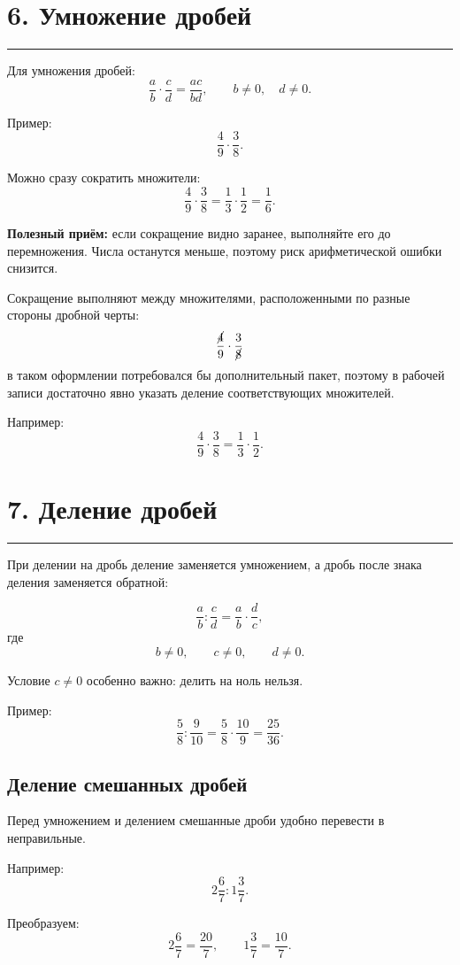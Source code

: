 \documentclass[a4paper,12pt]{article}
\newcommand{\sectionline}{%
    \vspace{-0.25em}
    {\color{accent}\rule{\linewidth}{0.7pt}}
    \vspace{0.3em}
}
\newcommand{\important}[1]{\textcolor{darkaccent}{\textbf{#1}}}
\begin{document}
\section*{\color{darkaccent}6. Умножение дробей}
\sectionline

Для умножения дробей:
\[
\frac ab\cdot\frac cd
=
\frac{ac}{bd},
\qquad b\ne0,\quad d\ne0.
\]

Пример:
\[
\frac49\cdot\frac38.
\]

Можно сразу сократить множители:
\[
\frac49\cdot\frac38
=
\frac{1}{3}\cdot\frac{1}{2}
=
\frac16.
\]

\important{Полезный приём:}
если сокращение видно заранее, выполняйте его до перемножения.
Числа останутся меньше, поэтому риск арифметической ошибки снизится.

Сокращение выполняют между множителями, расположенными по разные стороны
дробной черты:
\[
\frac{\cancel{4}}{9}\cdot\frac{3}{\cancel{8}}
\]
в таком оформлении потребовался бы дополнительный пакет, поэтому в рабочей
записи достаточно явно указать деление соответствующих множителей.

Например:
\[
\frac49\cdot\frac38
=
\frac{1}{3}\cdot\frac12.
\]


\section*{\color{darkaccent}7. Деление дробей}
\sectionline

При делении на дробь деление заменяется умножением, а дробь после знака
деления заменяется обратной:

\[
\frac ab:\frac cd
=
\frac ab\cdot\frac dc,
\]
где
\[
b\ne0,\qquad c\ne0,\qquad d\ne0.
\]

Условие \(c\ne0\) особенно важно: делить на ноль нельзя.

Пример:
\[
\frac58:\frac9{10}
=
\frac58\cdot\frac{10}{9}
=
\frac{25}{36}.
\]

\subsection*{\color{accent}Деление смешанных дробей}

Перед умножением и делением смешанные дроби удобно перевести в неправильные.

Например:
\[
2\frac67:1\frac37.
\]

Преобразуем:
\[
2\frac67=\frac{20}{7},
\qquad
1\frac37=\frac{10}{7}.
\]
\end{document}
